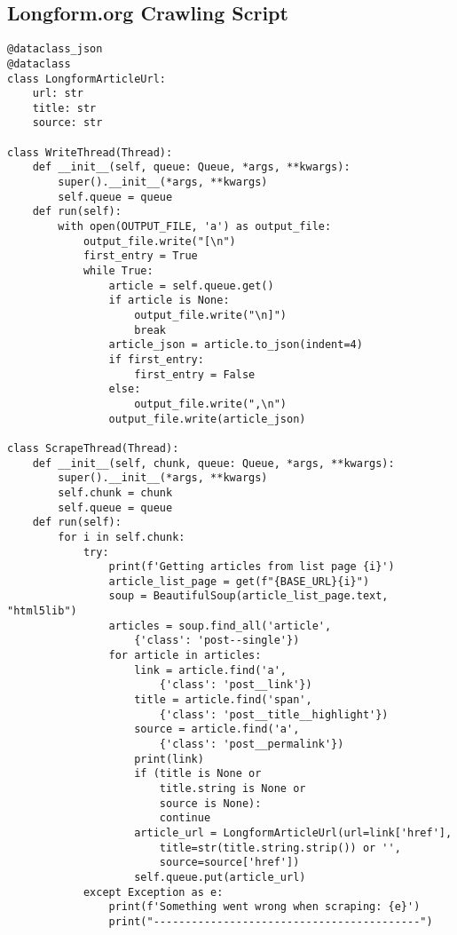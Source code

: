\subsection{Longform.org Crawling Script}
\begin{verbatim}
@dataclass_json
@dataclass
class LongformArticleUrl:
    url: str
    title: str
    source: str

class WriteThread(Thread):
    def __init__(self, queue: Queue, *args, **kwargs):
        super().__init__(*args, **kwargs)
        self.queue = queue
	def run(self):
        with open(OUTPUT_FILE, 'a') as output_file:
            output_file.write("[\n")
            first_entry = True
			while True:
			    article = self.queue.get()
				if article is None:
			        output_file.write("\n]")
			        break
				article_json = article.to_json(indent=4)
				if first_entry:
			        first_entry = False
			    else:
			        output_file.write(",\n")
				output_file.write(article_json)

class ScrapeThread(Thread):
    def __init__(self, chunk, queue: Queue, *args, **kwargs):
        super().__init__(*args, **kwargs)
        self.chunk = chunk
        self.queue = queue
	def run(self):
        for i in self.chunk:
            try:
                print(f'Getting articles from list page {i}')
                article_list_page = get(f"{BASE_URL}{i}")
                soup = BeautifulSoup(article_list_page.text, "html5lib")
                articles = soup.find_all('article', 
                    {'class': 'post--single'})
                for article in articles: 
                    link = article.find('a', 
                        {'class': 'post__link'})
                    title = article.find('span', 
                        {'class': 'post__title__highlight'})
                    source = article.find('a', 
                        {'class': 'post__permalink'})
                    print(link)
                    if (title is None or 
                        title.string is None or 
                        source is None):
                        continue
                    article_url = LongformArticleUrl(url=link['href'], 
                        title=str(title.string.strip()) or '', 
                        source=source['href'])
                    self.queue.put(article_url)
            except Exception as e:
                print(f'Something went wrong when scraping: {e}')
                print("------------------------------------------")
\end{verbatim}
